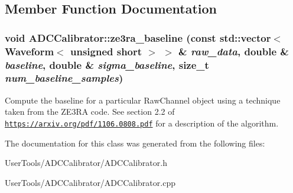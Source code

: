 \subsection{Member Function Documentation}
\hypertarget{classADCCalibrator_a94399155c9abcf28b5294b8a6e936ee4}{
\subsubsection[{ze3ra\_\-baseline}]{\setlength{\rightskip}{0pt plus 5cm}void ADCCalibrator::ze3ra\_\-baseline (const std::vector$<$ {\bf Waveform}$<$ unsigned short $>$ $>$ \& {\em raw\_\-data}, \/  double \& {\em baseline}, \/  double \& {\em sigma\_\-baseline}, \/  size\_\-t {\em num\_\-baseline\_\-samples})}}
\label{classADCCalibrator_a94399155c9abcf28b5294b8a6e936ee4}


Compute the baseline for a particular RawChannel object using a technique taken from the ZE3RA code. See section 2.2 of \href{https://arxiv.org/pdf/1106.0808.pdf}{\tt https://arxiv.org/pdf/1106.0808.pdf} for a description of the algorithm. 

The documentation for this class was generated from the following files:\begin{DoxyCompactItemize}
\item 
UserTools/ADCCalibrator/ADCCalibrator.h\item 
UserTools/ADCCalibrator/ADCCalibrator.cpp\end{DoxyCompactItemize}
